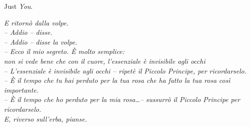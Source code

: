 \vfill

\noindent Just \emph{You}.

\vfill


\iffalse
Put your acknowledgments here.

Many thanks to everybody who already sent me a postcard!

Regarding the typography and other help, many thanks go to Marco 
Kuhlmann, Philipp Lehman, Lothar Schlesier, Jim Young, Lorenzo 
Pantieri and Enrico Gregorio\footnote{Members of GuIT (Gruppo 
Italiano Utilizzatori di \TeX\ e \LaTeX )}, J\"org Sommer, 
Joachim K\"ostler, Daniel Gottschlag, Denis Aydin, Paride 
Legovini, Steffen Prochnow, Nicolas Repp, Hinrich Harms, 
 Roland Winkler, J\"org Weber, 
 and the whole \LaTeX-community for support, ideas and 
 some great software.

\bigskip

\noindent\emph{Regarding \mLyX}: The \mLyX\ port was intially done by 
\emph{Nicholas Mariette} in March 2009 and continued by 
\emph{Ivo Pletikosi\'c} in 2011. Thank you very much for your 
work and the contributions to the original style.
\fi

\endgroup

\vfill

\begin{flushright}{\slshape    
    \vskip-3cm 
    \rightskip-3cm
    E ritorn\`o dalla volpe.\\
    -- Addio -- disse.\\
    -- Addio -- disse la volpe.\\
    -- Ecco il mio segreto. \`E molto semplice:\\
        \flqq non si vede bene che con il cuore,
        l'essenziale \`e invisibile agli occhi\frqq\\
    -- L'essenziale \`e invisibile agli occhi -- ripet\`e il Piccolo Principe, per ricordarselo.\\
    -- \`E il tempo che tu hai perduto per la tua rosa che ha fatto la tua rosa cos\`i importante.\\
    -- \`E il tempo che ho perduto per la mia rosa\ldots -- sussurr\`o il Piccolo Principe per ricordarselo.\\
    E, riverso sull'erba, pianse.\\
    \quad
    } 
\end{flushright}

